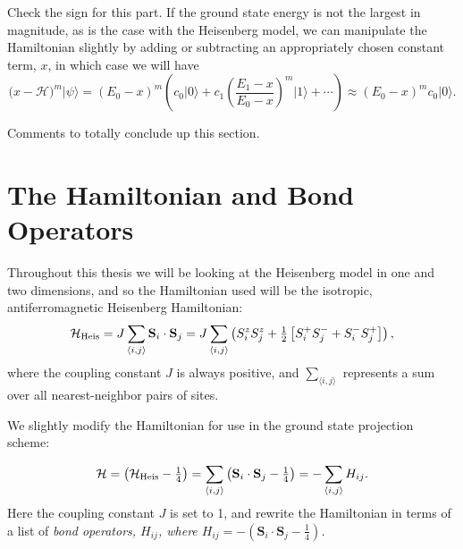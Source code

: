 {\color{red} Check the sign for this part.}
If the ground state energy is not the largest in magnitude, as is the case with the Heisenberg
model, we can manipulate the Hamiltonian slightly by adding or subtracting an
appropriately chosen constant term, $x$, in which case we will have
\begin{equation}
(x-\mathcal{H)}^m\lvert \psi \rangle =
		(E_0-x)^m \left(c_0 \lvert 0 \rangle + 
		c_1 \left(\frac{E_1-x}{E_0-x}\right)^m \lvert 1 \rangle  + \cdots \right)
		\approx (E_0-x)^m c_0 \lvert 0 \rangle.
\end{equation}

{\color{red} Comments to totally conclude up this section.}


\section{The Hamiltonian and Bond Operators}
Throughout this thesis we will be looking at the Heisenberg model in one and two dimensions,
and so the Hamiltonian used will be the isotropic, antiferromagnetic Heisenberg 
Hamiltonian:
\begin{equation}
\mathcal{H}_{\rm{Heis}}=J\sum_{\langle i,j \rangle} \mathbf{S}_i\cdot \mathbf{S}_j
= J\sum_{\langle i,j \rangle}
	\left( S_i^z S_j^z + \tfrac{1}{2}\left[ S_i^+ S_j^- + S_i^- S_j^+ \right]\right),
\end{equation}
where the coupling constant $J$ is always positive, and $\sum_{\langle i,j \rangle}$ 
represents a sum over all nearest-neighbor pairs of sites.  

We slightly modify the Hamiltonian for use in the ground state projection scheme:

\begin{equation}
\mathcal{H}= \left(\mathcal{H}_{\rm{Heis}} - \tfrac{1}{4} \right)= \sum_{\langle i,j \rangle} 
	\left(\mathbf{S}_i\cdot \mathbf{S}_j - \tfrac{1}{4}\right)
	= - \sum_{\langle i,j \rangle} H_{ij}.
\end{equation}
Here the coupling constant $J$ is set to 1, and rewrite the Hamiltonian in terms of a list of
\it{bond operators}, \rm $H_{ij}$, where 
$H_{ij}=-\left(\mathbf{S}_i\cdot \mathbf{S}_j - \tfrac{1}{4}\right)$.

